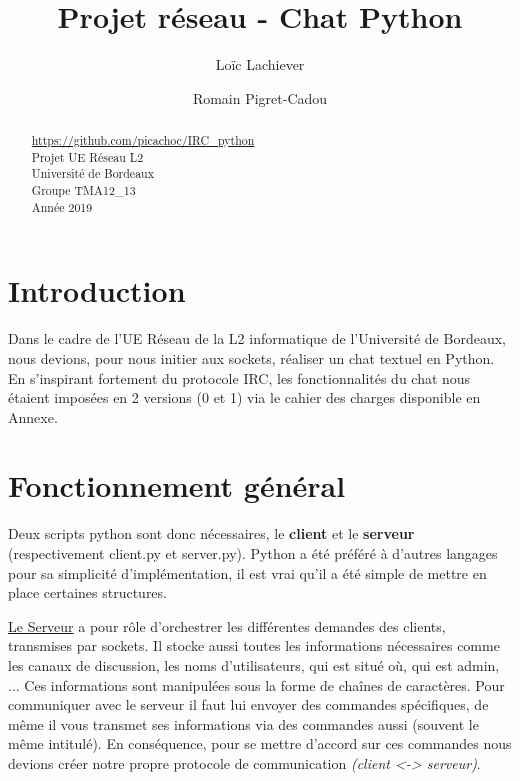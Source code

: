 \documentclass[12pt]{article}
\title{Projet réseau - Chat Python}
\author{Loïc Lachiever}
\author{Romain Pigret-Cadou}
\begin{document}
\maketitle


\begin{abstract}
    \begin{center}
    \url{https://github.com/picachoc/IRC_python}
    \\Projet UE Réseau L2
    \\Université de Bordeaux
    \\Groupe TMA12\_13
    \\Année 2019
    \end{center}
\end{abstract}


\tableofcontents



\section{Introduction}
Dans le cadre de l'UE Réseau de la L2 informatique de l'Université de Bordeaux,
nous devions, pour nous initier aux sockets, réaliser un chat textuel en Python.
En s'inspirant fortement du protocole IRC, les fonctionnalités du chat nous étaient
imposées en 2 versions (0 et 1) via le cahier des charges disponible en Annexe.

\section{Fonctionnement général}

Deux scripts python sont donc nécessaires, le \textbf{client} et
le \textbf{serveur} (respectivement
client.py et server.py). Python a été préféré à d'autres langages pour sa simplicité
d'implémentation, il est vrai qu'il a été simple de mettre en place
certaines structures.

\underline{Le Serveur} a pour rôle d'orchestrer les différentes demandes des clients,
transmises par sockets. Il stocke aussi toutes les informations nécessaires comme
les canaux de discussion, les noms d'utilisateurs, qui est situé où, qui est admin, ...
Ces informations sont manipulées sous la forme de chaînes de caractères.
Pour communiquer avec le serveur il faut lui envoyer des commandes spécifiques,
de même il vous transmet ses informations via des commandes aussi (souvent le même intitulé).
En conséquence, pour se mettre d'accord sur ces commandes nous devions créer notre propre
protocole de communication \emph{(client <-> serveur)}.
\end{document}
